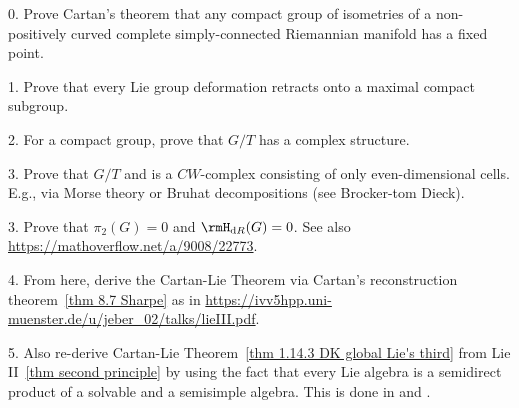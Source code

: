 
0. Prove Cartan's theorem that any compact group of isometries of a non-positively curved complete simply-connected Riemannian manifold has a fixed point.

1. Prove that every Lie group deformation retracts onto a maximal compact subgroup.

2. For a compact group, prove that $G/T$ has a complex structure.

3. Prove that $G/T$ and is a $CW$-complex consisting of only even-dimensional cells. E.g., via Morse theory or Bruhat decompositions (see Brocker-tom Dieck).

3. Prove that $\pi_2(G)=0$ and $\rmH_{\mathrm dR}(G)=0$. See also \url{https://mathoverflow.net/a/9008/22773}.

4. From here, derive the Cartan-Lie Theorem via Cartan's reconstruction theorem~\ref{thm 8.7 Sharpe} as in \url{https://ivv5hpp.uni-muenster.de/u/jeber_02/talks/lieIII.pdf}. 

5. Also re-derive Cartan-Lie Theorem~\ref{thm 1.14.3 DK global Lie's third} from Lie II~\ref{thm second principle} by using the fact that every Lie algebra is a semidirect product of a solvable and a semisimple algebra. This is done in \cite[Rem.~9.5.12]{HN} and \cite{Borcherds}.



